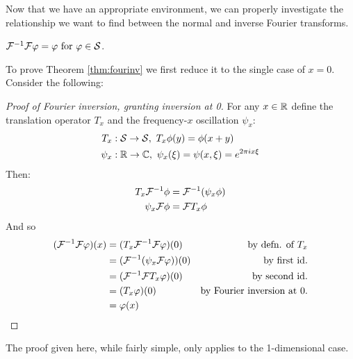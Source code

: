 \documentclass[thesis.tex]{subfiles}
\begin{document}
    Now that we have an appropriate environment, we can properly investigate the relationship we want to find between the normal and inverse Fourier transforms.
    \begin{thm}
      \label{thm:fourinv}
      $\mathcal{F}^{-1}\mathcal{F} \varphi = \varphi \text{ for } \varphi\in\mathcal{S}$.
    \end{thm}
    To prove Theorem \ref{thm:fourinv} we first reduce it to the single case of $x=0$.
    Consider the following:
    \begin{proof}[Proof of Fourier inversion, granting inversion at 0]
      For any $x\in\mathbb{R}$ define the translation operator $T_x$ and the frequency-$x$ oscillation $\psi_x$:
      \begin{align*}
        T_x&:\mathcal{S}\rightarrow\mathcal{S},\ T_x\phi(y) = \phi(x+y)\\
        \psi_x&:\mathbb{R}\rightarrow\mathbb{C},\ \psi_x(\xi) = \psi(x,\xi) = e^{2\pi i x \xi}
      \end{align*}
      Then: 
      \begin{align*}
        T_x\mathcal{F}^{-1}\phi &= \mathcal{F}^{-1}(\psi_x\phi)\\
        \psi_x\mathcal{F}\phi &= \mathcal{F} T_x\phi
      \end{align*}
      And so
      \begin{align*}
        (\mathcal{F}^{-1}\mathcal{F}\varphi)(x) &= (T_x\mathcal{F}^{-1}\mathcal{F}\varphi)(0) &\text{by defn. of $T_x$}\\
        &= (\mathcal{F}^{-1}(\psi_x\mathcal{F}\varphi))(0) &\text{by first id.}\\
        &= (\mathcal{F}^{-1}\mathcal{F} T_x\varphi)(0)  &\text{by second id.}\\
        &= (T_x\varphi)(0) &\text{by Fourier inversion at 0.}\\
        &= \varphi(x)&\qedhere
      \end{align*}
    \end{proof}

    \begin{rmk}
      The proof given here, while fairly simple, only applies to the 1-dimensional case. 
    \end{rmk}
\end{document}
